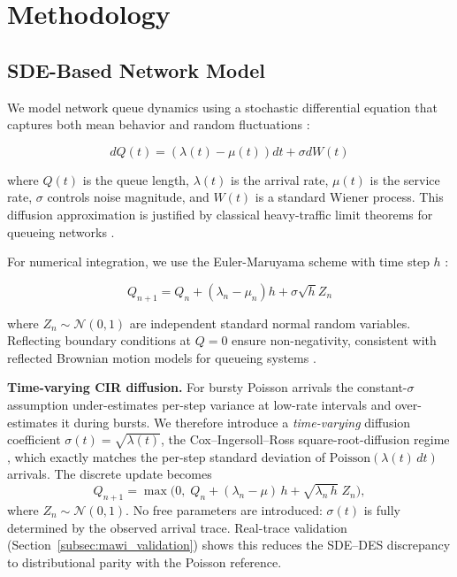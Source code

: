 \documentclass[pdflatex,sn-mathphys-num]{sn-jnl}
\theoremstyle{thmstyleone}%
\theoremstyle{thmstyletwo}%
\theoremstyle{thmstylethree}%
\begin{document}
\section{Methodology}

\subsection{SDE-Based Network Model}

We model network queue dynamics using a stochastic differential equation that captures both mean
behavior and random fluctuations \cite{kloeden1992,khasminskii2012}:

\begin{equation}
    dQ(t) = (\lambda(t) - \mu(t))dt + \sigma dW(t)
    \label{eq:sde}
\end{equation}

\noindent where $Q(t)$ is the queue length, $\lambda(t)$ is the arrival rate, $\mu(t)$ is the
service rate, $\sigma$ controls noise magnitude, and $W(t)$ is a standard Wiener process. This
diffusion approximation is justified by classical heavy-traffic limit theorems for queueing
networks \cite{kang2007,whitt2002}.

For numerical integration, we use the Euler-Maruyama scheme with time step $h$
\cite{kloeden1992}:

\begin{equation}
    Q_{n+1} = Q_n + (\lambda_n - \mu_n)h + \sigma\sqrt{h}Z_n
    \label{eq:euler}
\end{equation}

\noindent where $Z_n \sim \mathcal{N}(0,1)$ are independent standard normal random variables.
Reflecting boundary conditions at $Q=0$ ensure non-negativity, consistent with reflected Brownian
motion models for queueing systems \cite{harrison1985}.

\par\noindent\textbf{Time-varying CIR diffusion.}
For bursty Poisson arrivals the constant-$\sigma$ assumption under-estimates per-step variance at
low-rate intervals and over-estimates it during bursts. We therefore introduce a
\emph{time-varying} diffusion coefficient $\sigma(t)=\sqrt{\lambda(t)}$, the
Cox--Ingersoll--Ross square-root-diffusion regime \cite{kang2007}, which exactly matches the
per-step standard deviation of $\mathrm{Poisson}(\lambda(t)\,dt)$ arrivals. The discrete update
becomes
\begin{equation}
    Q_{n+1} = \max\!\bigl(0,\; Q_n + (\lambda_n - \mu)\,h + \sqrt{\lambda_n\,h}\;Z_n\bigr),
    \label{eq:tv_sigma}
\end{equation}
where $Z_n \sim \mathcal{N}(0,1)$.  No free parameters are introduced: $\sigma(t)$ is fully
determined by the observed arrival trace. Real-trace validation
(Section~\ref{subsec:mawi_validation}) shows this reduces the SDE--DES discrepancy to
distributional parity with the Poisson reference.
\end{document}
